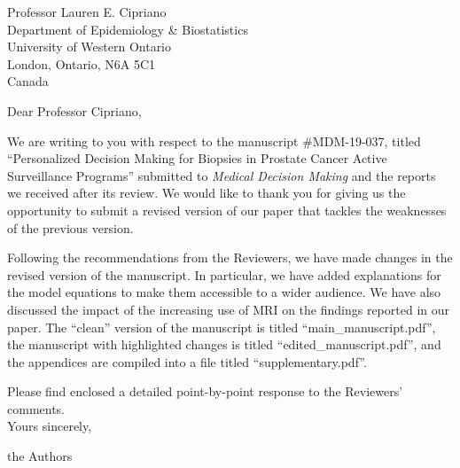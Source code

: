 \documentclass[a4paper, 11pt]{letter}
\begin{document}
\begin{letter}{Professor Lauren E. Cipriano\\
Department of Epidemiology \& Biostatistics\\
University of Western Ontario\\
London, Ontario, N6A 5C1\\
Canada}

\address{Department of Biostatistics\\
Erasmus University Medical Center\\PO Box 2040, 3000 CA Rotterdam\\ the Netherlands
}

\opening{Dear Professor Cipriano,}

We are writing to you with respect to the manuscript \#MDM-19-037, titled ``Personalized Decision Making for Biopsies in Prostate Cancer Active Surveillance Programs'' submitted to \emph{Medical Decision Making} and the reports we received after its review. We would like to thank you for giving us the opportunity to submit a revised version of our paper that tackles the weaknesses of the previous version.

Following the recommendations from the Reviewers, we have made changes in the revised version of the manuscript. In particular, we have added explanations for the model equations to make them accessible to a wider audience. We have also discussed the impact of the increasing use of MRI on the findings reported in our paper. The ``clean'' version of the manuscript is titled ``main\_manuscript.pdf'', the manuscript with highlighted changes is titled ``edited\_manuscript.pdf'', and the appendices are compiled into a file titled ``supplementary.pdf''.

Please find enclosed a detailed point-by-point response to the Reviewers' comments.\\

Yours sincerely,

the Authors
\end{letter}
\end{document}
